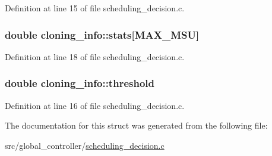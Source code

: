 Definition at line 15 of file scheduling\-\_\-decision.\-c.

\hypertarget{structcloning__info_ae5a0cd5ac7c7fdce2c04cf7f18b1e867}{
\subsubsection[{stats}]{\setlength{\rightskip}{0pt plus 5cm}double cloning\-\_\-info\-::stats\mbox{[}{\bf M\-A\-X\-\_\-\-M\-S\-U}\mbox{]}}}\label{structcloning__info_ae5a0cd5ac7c7fdce2c04cf7f18b1e867}


Definition at line 18 of file scheduling\-\_\-decision.\-c.

\hypertarget{structcloning__info_a8921289494a18492f6db5396e36fda15}{
\subsubsection[{threshold}]{\setlength{\rightskip}{0pt plus 5cm}double cloning\-\_\-info\-::threshold}}\label{structcloning__info_a8921289494a18492f6db5396e36fda15}


Definition at line 16 of file scheduling\-\_\-decision.\-c.



The documentation for this struct was generated from the following file\-:\begin{DoxyCompactItemize}
\item 
src/global\-\_\-controller/\hyperlink{scheduling__decision_8c}{scheduling\-\_\-decision.\-c}\end{DoxyCompactItemize}
